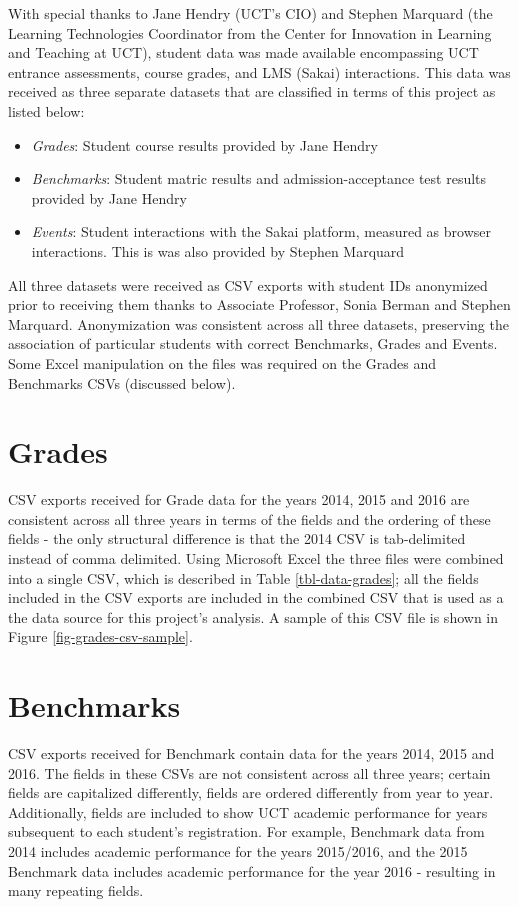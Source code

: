With special thanks to Jane Hendry (UCT's CIO) and Stephen Marquard (the Learning Technologies Coordinator from the Center for Innovation in Learning and Teaching at UCT), student data was made available encompassing UCT entrance assessments, course grades, and LMS (Sakai) interactions. This data was received as three separate datasets that are classified in terms of this project as listed below:

\begin{itemize}
    \item \textit{Grades}: Student course results provided by Jane Hendry
    \item \textit{Benchmarks}: Student matric results and admission-acceptance test results provided by Jane Hendry
    \item \textit{Events}: Student interactions with the Sakai platform, measured as browser interactions. This is was also provided by Stephen Marquard
\end{itemize}

All three datasets were received as CSV exports with student IDs anonymized prior to receiving them thanks to Associate Professor, Sonia Berman and Stephen Marquard. Anonymization was consistent across all three datasets, preserving the association of particular students with correct Benchmarks, Grades and Events. Some Excel manipulation on the files was required on the Grades and Benchmarks CSVs (discussed below).

\section{Grades}
CSV exports received for Grade data for the years 2014, 2015 and 2016 are consistent across all three years in terms of the fields and the ordering of these fields - the only structural difference is that the 2014 CSV is tab-delimited instead of comma delimited. Using Microsoft Excel the three files were combined into a single CSV, which is described in Table \ref{tbl-data-grades}; all the fields included in the CSV exports are included in the combined CSV that is used as a the data source for this project's analysis. A sample of this CSV file is shown in Figure \ref{fig-grades-csv-sample}.




\section{Benchmarks}
CSV exports received for Benchmark contain data for the years 2014, 2015 and 2016. The fields in these CSVs are not consistent across all three years; certain fields are capitalized differently, fields are ordered differently from year to year. Additionally, fields are included to show UCT academic performance for years subsequent to each student's registration. For example, Benchmark data from 2014 includes academic performance for the years 2015/2016, and the 2015 Benchmark data includes academic performance for the year 2016 - resulting in many repeating fields.

